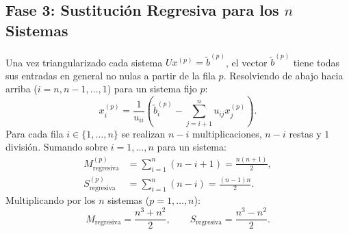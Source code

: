\documentclass[11pt,letterpaper]{article}
\begin{document}
\subsection{Fase 3: Sustitución Regresiva para los $n$ Sistemas}
Una vez triangularizado cada sistema $U x^{(p)} = \tilde{b}^{(p)}$, el vector $\tilde{b}^{(p)}$ tiene todas sus entradas en general no nulas a partir de la fila $p$. Resolviendo de abajo hacia arriba ($i = n, n-1, \dots, 1$) para un sistema fijo $p$:
\begin{equation}
    x_i^{(p)} = \frac{1}{u_{ii}} \left( \tilde{b}_i^{(p)} - \sum_{j=i+1}^{n} u_{ij} x_j^{(p)} \right).
\end{equation}
Para cada fila $i \in \{1, \dots, n\}$ se realizan $n - i$ multiplicaciones, $n - i$ restas y $1$ división. Sumando sobre $i = 1, \dots, n$ para un sistema:
\begin{align}
    M_{\text{regresiva}}^{(p)} &= \sum_{i=1}^{n} (n - i + 1) = \frac{n(n+1)}{2}, \\
    S_{\text{regresiva}}^{(p)} &= \sum_{i=1}^{n} (n - i) = \frac{(n-1)n}{2}.
\end{align}
Multiplicando por los $n$ sistemas ($p = 1, \dots, n$):
\begin{equation}
    M_{\text{regresiva}} = \frac{n^3 + n^2}{2}, \qquad S_{\text{regresiva}} = \frac{n^3 - n^2}{2}.
\end{equation}
\end{document}
